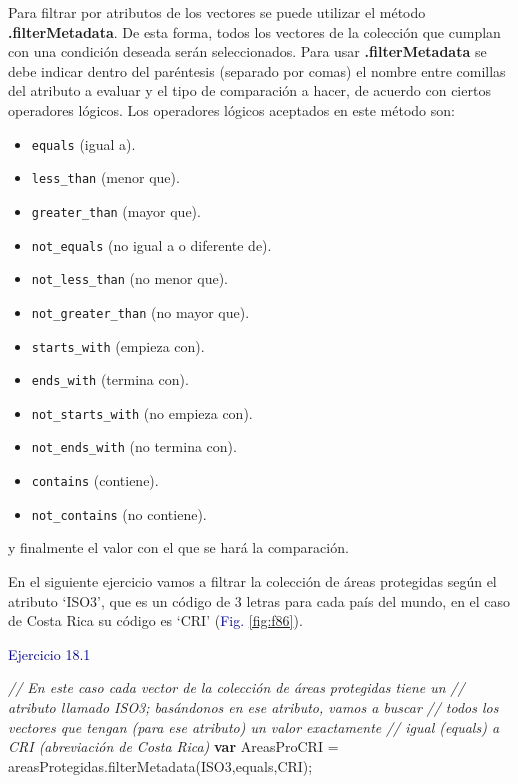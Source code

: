\documentclass[
  12pt,
  letterpaper,
  twoside]{book}
\newenvironment{Shaded}{\begin{snugshade}}{\end{snugshade}}
\newcommand{\CommentTok}[1]{\textcolor[rgb]{0.24,0.58,0.00}{\textit{#1}}}
\newcommand{\FunctionTok}[1]{\textcolor[rgb]{0.48,0.12,0.64}{#1}}
\newcommand{\KeywordTok}[1]{\textcolor[rgb]{0.00,0.00,0.00}{\textbf{#1}}}
\newcommand{\NormalTok}[1]{#1}
\newcommand{\OperatorTok}[1]{\textcolor[rgb]{0.00,0.00,0.00}{#1}}
\newcommand{\StringTok}[1]{\textcolor[rgb]{0.87,0.29,0.22}{#1}}
\providecommand{\tightlist}{%
  \setlength{\itemsep}{0pt}\setlength{\parskip}{0pt}}
\newcommand\boldpurple[1]{\textcolor{darkpurple}{\textbf{#1}}}
\begin{document}
Para filtrar por atributos de los vectores se puede utilizar el método \boldpurple{.filterMetadata}. De esta forma, todos los vectores de la colección que cumplan con una condición deseada serán seleccionados. Para usar \boldpurple{.filterMetadata} se debe indicar dentro del paréntesis (separado por comas) el nombre entre comillas del atributo a evaluar y el tipo de comparación a hacer, de acuerdo con ciertos operadores lógicos. Los operadores lógicos aceptados en este método son:

\begin{itemize}
\tightlist
\item
  \texttt{equals} (igual a).
\item
  \texttt{less\_than} (menor que).
\item
  \texttt{greater\_than} (mayor que).
\item
  \texttt{not\_equals} (no igual a o diferente de).
\item
  \texttt{not\_less\_than} (no menor que).
\item
  \texttt{not\_greater\_than} (no mayor que).
\item
  \texttt{starts\_with} (empieza con).
\item
  \texttt{ends\_with} (termina con).
\item
  \texttt{not\_starts\_with} (no empieza con).
\item
  \texttt{not\_ends\_with} (no termina con).
\item
  \texttt{contains} (contiene).
\item
  \texttt{not\_contains} (no contiene).
\end{itemize}

y finalmente el valor con el que se hará la comparación.

En el siguiente ejercicio vamos a filtrar la colección de áreas protegidas según el atributo `ISO3', que es un código de 3 letras para cada país del mundo, en el caso de Costa Rica su código es `CRI' (\textcolor{darkblue}{Fig.} \ref{fig:f86}).

\textcolor{darkblue}{Ejercicio 18.1}

\begin{Shaded}
\begin{Highlighting}[]
\CommentTok{// En este caso cada vector de la colección de áreas protegidas tiene un }
\CommentTok{// atributo llamado \textquotesingle{}ISO3\textquotesingle{}; basándonos en ese atributo, vamos a buscar }
\CommentTok{// todos los vectores que tengan (para ese atributo) un valor exactamente }
\CommentTok{// igual (\textquotesingle{}equals\textquotesingle{}) a \textquotesingle{}CRI\textquotesingle{} (abreviación de Costa Rica)}
\KeywordTok{var}\NormalTok{ AreasProCRI }\OperatorTok{=}\NormalTok{ areasProtegidas}\OperatorTok{.}\FunctionTok{filterMetadata}\NormalTok{(}\StringTok{\textquotesingle{}ISO3\textquotesingle{}}\OperatorTok{,}\StringTok{\textquotesingle{}equals\textquotesingle{}}\OperatorTok{,}\StringTok{\textquotesingle{}CRI\textquotesingle{}}\NormalTok{)}\OperatorTok{;} 
\end{Highlighting}
\end{Shaded}
\end{document}
